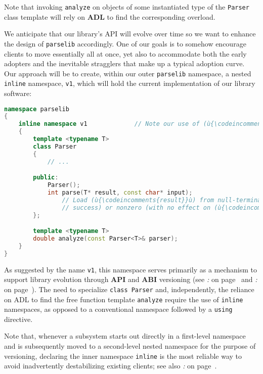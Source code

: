\noindent Note that invoking \texttt{analyze} on objects of some instantiated type
of the \texttt{Parser} class template will rely on \textbf{ADL} to find
the corresponding overload.

We anticipate that our library's API will evolve over time so we want to
enhance the design of \texttt{parselib} accordingly. One of our goals is
to somehow encourage clients to move essentially all at once, yet also to
accommodate both the early adopters and the inevitable stragglers that
make up a typical adoption curve. Our approach will be to create, within
our outer \texttt{parselib} namespace, a nested \texttt{inline}
namespace, \texttt{v1}, which will hold the current implementation of
our library software:

\begin{lstlisting}[language=C++]
namespace parselib
{
    inline namespace v1             // Note our use of (ù{\codeincomments{inline}}ù) namespace here.
    {
        template <typename T>
        class Parser
        {
            // ...

        public:
            Parser();
            int parse(T* result, const char* input);
                // Load (ù{\codeincomments{result}}ù) from null-terminated (ù{\codeincomments{input}}ù); return 0 (on
                // success) or nonzero (with no effect on (ù{\codeincomments{result}}ù)).
        };

        template <typename T>
        double analyze(const Parser<T>& parser);
    }
}
\end{lstlisting}
    
\noindent As suggested by the name \texttt{v1}, this namespace serves primarily as
a mechanism to support library evolution through \textbf{API} and
\textbf{ABI} versioning (see \textit{: } on page~\pageref{link-safe-abi-versioning} and \textit{: } on page~\pageref{build-modes-and-abi-link-safety}). The need to specialize \texttt{class}~\texttt{Parser} and,
independently, the reliance on ADL to find the free function template
\texttt{analyze} require the use of \texttt{inline} namespaces, as
opposed to a conventional namespace followed by a \texttt{using}
directive.

Note that, whenever a subsystem starts out directly in a first-level
namespace and is subsequently moved to a second-level nested namespace
for the purpose of versioning, declaring the inner namespace
\texttt{inline} is the most reliable way to avoid inadvertently
destabilizing existing clients; see also \textit{: } on page~\pageref{enabling-selective-using-directives-for-short-named-entities}.

